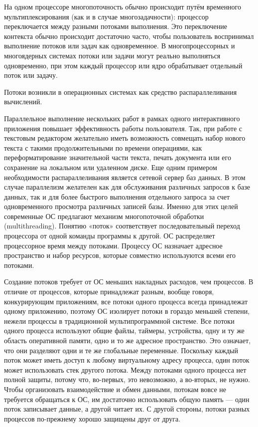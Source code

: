 \documentclass[12pt]{report}
\begin{document}
На одном процессоре многопоточность обычно происходит путём временного мультиплексирования (как и в случае многозадачности): процессор переключается между разными потоками выполнения. Это переключение контекста обычно происходит достаточно часто, чтобы пользователь воспринимал выполнение потоков или задач как одновременное. В многопроцессорных и многоядерных системах потоки или задачи могут реально выполняться одновременно, при этом каждый процессор или ядро обрабатывает отдельный поток или задачу.

Потоки возникли в операционных системах как средство распараллеливания вычислений.

Параллельное выполнение нескольких работ в рамках одного интерактивного приложения повышает эффективность работы пользователя. Так, при работе с текстовым редактором желательно иметь возможность совмещать набор нового текста с такими продолжительными по времени операциями, как переформатирование значительной части текста, печать документа или его сохранение на локальном или удаленном диске. Еще одним примером необходимости распараллеливания является сетевой сервер баз данных. В этом случае параллелизм желателен как для обслуживания различных запросов к базе данных, так и для более быстрого выполнения отдельного запроса за счет одновременного просмотра различных записей базы. Именно для этих целей современные ОС предлагают механизм многопоточной обработки (multithreading). Понятию «поток» соответствует последовательный переход процессора от одной команды программы к другой. ОС распределяет процессорное время между потоками. Процессу ОС назначает адресное пространство и набор ресурсов, которые совместно используются всеми его потоками. 

Создание потоков требует от ОС меньших накладных расходов, чем процессов. В отличие от процессов, которые принадлежат разным, вообще говоря, конкурирующим приложениям, все потоки одного процесса всегда принадлежат одному приложению, поэтому ОС изолирует потоки в гораздо меньшей степени, нежели процессы в традиционной мультипрограммной системе. Все потоки одного процесса используют общие файлы, таймеры, устройства, одну и ту же область оперативной памяти, одно и то же адресное пространство. Это означает, что они разделяют одни и те же глобальные переменные. Поскольку каждый поток может иметь доступ к любому виртуальному адресу процесса, один поток может использовать стек другого потока. Между потоками одного процесса нет полной защиты, потому что, во-первых, это невозможно, а во-вторых, не нужно. Чтобы организовать взаимодействие и обмен данными, потокам вовсе не требуется обращаться к ОС, им достаточно использовать общую память — один поток записывает данные, а другой читает их. С другой стороны, потоки разных процессов по-прежнему хорошо защищены друг от друга.
\end{document}
